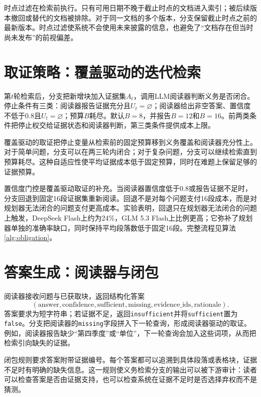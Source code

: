 时点过滤在检索前执行。只有可用日期不晚于截止时点的文档进入索引；被后续版本撤回或替代的文档被排除。对于同一文档的多个版本，分支保留截止时点之前的最新版本。时点过滤使系统不会使用未来披露的信息，也避免了“文档存在但当时尚未发布”的前视偏差。

\section{取证策略：覆盖驱动的迭代检索}

第$t$轮检索后，分支把新增块加入证据集$A_t$，调用LLM阅读器判断义务是否闭合。停止条件有三类：阅读器报告证据充分且$U_t=\varnothing$；阅读器给出非空答案、置信度不低于0.8且$U_t=\varnothing$；预算$B$耗尽。默认$B=8$，并报告$B=12$和$B=16$。前两类条件把停止权交给证据状态和阅读器判断，第三类条件提供成本上限。

覆盖驱动的取证把停止变量从检索前的固定预算移到义务覆盖和阅读器充分性上。对于简单问题，分支可以在两三轮内闭合；对于复杂问题，分支可以继续检索直到预算耗尽。这种自适应性使平均证据成本低于固定预算，同时在难题上保留足够的证据预算。

置信度门控是覆盖驱动取证的补充。当阅读器置信度低于0.8或报告证据不足时，分支回退到固定16段证据集重新阅读。回退不是对每个问题支付16段成本，而是对规划器无法闭合的问题支付更高成本。实验表明，回退只在规划器无法闭合的问题上触发，DeepSeek Flash上约为24\%，GLM 5.3 Flash上比例更高；它弥补了规划器单独的准确率缺口，同时保持平均段落数低于固定16段。完整流程见算法\ref{alg:obligation}。



\section{答案生成：阅读器与闭包}

阅读器接收问题与已获取块，返回结构化答案
\begin{equation}
(\text{answer},\text{confidence},\text{sufficient},\text{missing},\text{evidence\_ids},\text{rationale}).
\end{equation}
答案要求为短字符串；若证据不足，返回\texttt{insufficient}并将\texttt{sufficient}置为\texttt{false}。分支把阅读器的\texttt{missing}字段拼入下一轮查询，形成阅读器驱动的取证。例如，阅读器报告缺少“第四季度”或“单位”，下一轮查询会加入这些词项，从而把检索引向缺失的证据。

闭包规则要求答案附带证据编号。每个答案都可以追溯到具体段落或表格块，证据不足时有明确的缺失信息。这一规则使义务检索分支的输出可以被下游审计：读者可以检查答案是否由证据支持，也可以检查系统在证据不足时是否选择弃权而不是猜测。

